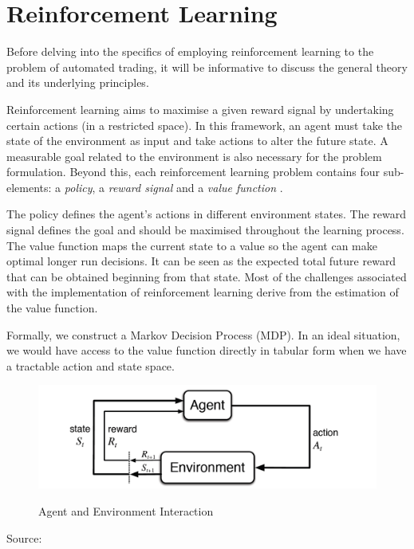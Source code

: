 \documentclass[12pt, authoryear]{elsarticle}
\begin{document}
\section{Reinforcement Learning}

Before delving into the specifics of employing reinforcement learning to the problem of automated trading, it will be informative to discuss the general theory and its underlying principles. 

Reinforcement learning aims to maximise a given reward signal by undertaking certain actions (in a restricted space). In this framework, an agent must take the state of the environment as input and take actions to alter the future state. A measurable goal related to the environment is also necessary for the problem formulation. Beyond this, each reinforcement learning problem contains four sub-elements: a \textit{policy}, a \textit{reward signal} and a \textit{value function} \citep{sutton1998introduction}.

The policy defines the agent's actions in different environment states. The reward signal defines the goal and should be maximised throughout the learning process. The value function maps the current state to a value so the agent can make optimal longer run decisions. It can be seen as the expected total future reward that can be obtained beginning from that state. Most of the challenges associated with the implementation of reinforcement learning derive from the estimation of the value function.

Formally, we construct a Markov Decision Process (MDP).
In an ideal situation, we would have access to the value function directly in tabular form when we have a tractable action and state space.

\begin{figure}[h!]
\centering
\caption{Agent and Environment Interaction}
\includegraphics[clip, angle=0, width=12cm]{figures/Loop.png}
\label{fig:1}
\end{figure}
\begin{center}
	{Source: \cite{sutton1998introduction}}
\end{center}
\end{document}
